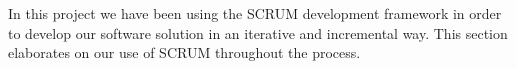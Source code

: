 In this project we have been using the SCRUM development framework in order to develop our software solution in an iterative and incremental way. This section elaborates on our use of SCRUM throughout the process.